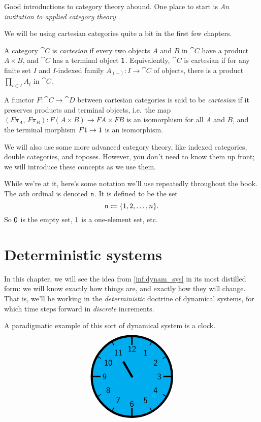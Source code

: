 \documentclass[DynamicalBook]{subfiles}
\begin{document}
Good introductions to category theory abound. One place to start is \emph{An invitation to applied category theory} \cite{fong2019seven}.

We will be using cartesian categories quite a bit in the first few chapters.
\begin{definition}\label{def.cartesian_category}
  A category $\cat{C}$ is \emph{cartesian} if every two objects $A$ and $B$ in
  $\cat{C}$ have a product $A \times B$, and $\cat{C}$ has a terminal object
  $\mathsf{1}$. Equivalently, $\cat{C}$ is cartesian if for any finite set $I$ and
  $I$-indexed family $A_{(-)} : I \to \cat{C}$ of objects, there is a product
  $\prod_{i \in I} A_i$ in $\cat{C}$.

  A functor $F : \cat{C} \to \cat{D}$ between cartesian categories is said to be
  \emph{cartesian} if it preserves products and terminal objects, i.e.\ the
  map $(F\pi_A,\, F\pi_B) : F(A \times B) \to FA \times FB$ is an isomorphism
  for all $A$ and $B$, and the terminal morphism $F\mathsf{1} \to \mathsf{1}$ is an
  isomorphism. 
\end{definition}

We will also use some more advanced category theory, like indexed
categories, double categories, and toposes. However, you don't need to know them up front; we will introduce these concepts
as we use them.

While we're at it, here's some notation we'll use repeatedly throughout the book. The $n$th ordinal is denoted $\mathsf{n}$. It is defined to be the set
\[
\mathsf{n}\coloneqq\{1,2,\ldots,n\}.
\]
So $\mathsf{0}$ is the empty set, $\mathsf{1}$ is a one-element set, etc.

\section{Deterministic systems}\label{sec.deterministic_system}

In this chapter, we will see the idea from \cref{inf.dynam_sys} in its
most distilled form: we will know exactly how things are, and exactly how they
will change. That is, we'll be working in the \emph{deterministic} doctrine of
dynamical systems,
for which time steps forward in \emph{discrete} increments.


A paradigmatic example of this sort of dynamical system is a clock.
\[
\begin{tikzpicture}[line cap=rect,line width=3pt]
\filldraw [fill=cyan] (0,0) circle [radius=2cm];
\foreach \angle [count=\xi] in {60,30,...,-270}
{
  \draw[line width=1pt] (\angle:1.8cm) -- (\angle:2cm);
  \node[font=\large] at (\angle:1.36cm) {\textsf{\xi}};
}
\foreach \angle in {0,90,180,270}
  \draw[line width=2pt] (\angle:1.6cm) -- (\angle:2cm);
\draw (0,0) -- (120:0.8cm);
\end{tikzpicture}
\]
\end{document}
